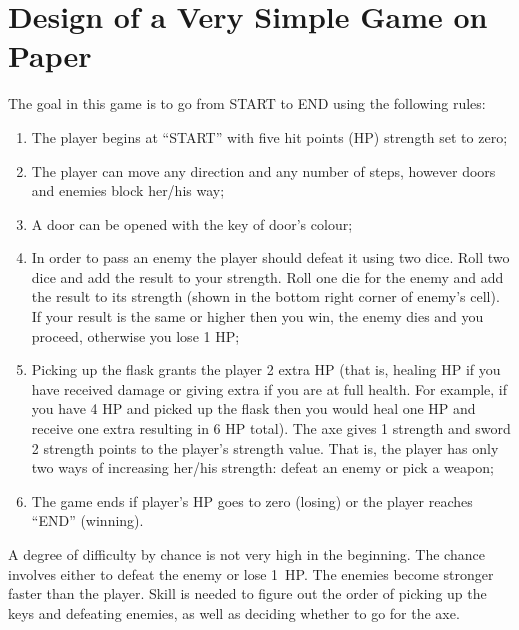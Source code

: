 \documentclass[landscape]{article}
\begin{document}
\thispagestyle{empty}

\section*{Design of a Very Simple Game on Paper}

The goal in this game is to go from START to END using the following rules:

\begin{enumerate}

  \item The player begins at ``START'' with five hit points (HP) strength set to
    zero;

  \item The player can move any direction and any number of steps, however doors
    and enemies block her/his way;

  \item A door can be opened with the key of door's colour;

  \item In order to pass an enemy the player should defeat it using two dice.
    Roll two dice and add the result to your strength. Roll one die for the
    enemy and add the result to its strength (shown in the bottom right corner
    of enemy's cell). If your result is the same or higher then you win, the
    enemy dies and you proceed, otherwise you lose 1 HP\@;

  \item Picking up the flask grants the player 2 extra HP (that is, healing HP
    if you have received damage or giving extra if you are at full health. For
    example, if you have 4 HP and picked up the flask then you would heal one HP
    and receive one extra resulting in 6 HP total). The axe gives 1 strength
    and sword 2 strength points to the player's strength value. That is, the
    player has only two ways of increasing her/his strength: defeat an enemy or
    pick a weapon;

  \item The game ends if player's HP goes to zero (losing) or the player
    reaches ``END'' (winning).

\end{enumerate}

A degree of difficulty by chance is not very high in the beginning. The chance
involves either to defeat the enemy or lose 1~HP\@. The enemies become stronger
faster than the player. Skill is needed to figure out the order of picking up
the keys and defeating enemies, as well as deciding whether to go for the axe.
\end{document}
